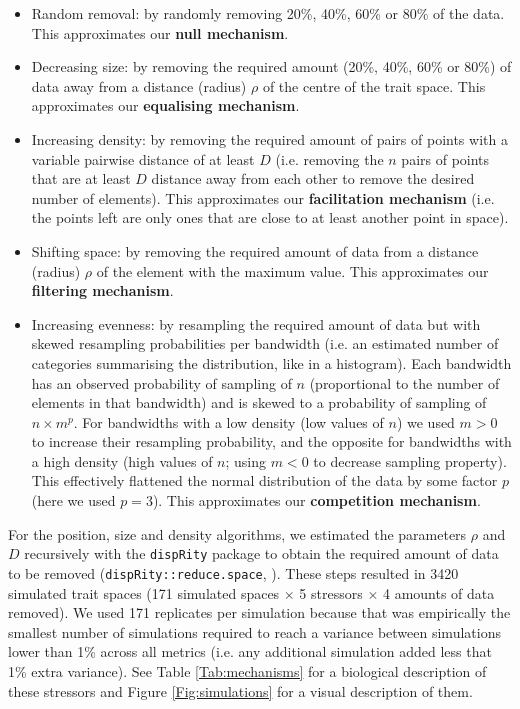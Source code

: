 \documentclass[12pt,letterpaper]{article}
\begin{document}
\begin{itemize}
\item Random removal: by randomly removing 20\%, 40\%, 60\% or 80\% of the data.
This approximates our \textbf{null mechanism}.

\item Decreasing size: by removing the required amount (20\%, 40\%, 60\% or 80\%) of data away from a distance (radius)  $\rho$ of the centre of the trait space.
This approximates our \textbf{equalising mechanism}.

\item Increasing density: by removing the required amount of pairs of points with a variable pairwise distance of at least $D$ (i.e. removing the $n$ pairs of points that are at least $D$ distance away from each other to remove the desired number of elements).
This approximates our \textbf{facilitation mechanism} (i.e. the points left are only ones that are close to at least another point in space).

\item Shifting space: by removing the required amount of data from a distance (radius) $\rho$ of the element with the maximum value.
This approximates our \textbf{filtering mechanism}.

\item Increasing evenness: by resampling the required amount of data but with skewed resampling probabilities per bandwidth (i.e. an estimated number of categories summarising the distribution, like in a histogram).
Each bandwidth has an observed probability of sampling of $n$ (proportional to the number of elements in that bandwidth) and is skewed to a probability of sampling of $n \times m^{p}$. 
For bandwidths with a low density (low values of $n$) we used $m>0$ to increase their resampling probability, and the opposite for bandwidths with a high density (high values of $n$; using $m<0$ to decrease sampling property).
This effectively flattened the normal distribution of the data by some factor $p$ (here we used $p=3$).
This approximates our \textbf{competition mechanism}.
\end{itemize}

For the position, size and density algorithms, we estimated the parameters $\rho$ and $D$ recursively with the \texttt{dispRity} package to obtain the required amount of data to be removed (\texttt{dispRity::reduce.space}, \citealt{guillerme2018disprity,guillerme2020shifting}).
These steps resulted in 3420 simulated trait spaces (171 simulated spaces $\times$ 5 stressors $\times$ 4 amounts of data removed).
We used 171 replicates per simulation because that was empirically the smallest number of simulations required to reach a variance between simulations lower than 1\% across all metrics (i.e. any additional simulation added less that 1\% extra variance).
See Table \ref{Tab:mechanisms} for a biological description of these stressors and Figure \ref{Fig:simulations} for a visual description of them.
\end{document}
